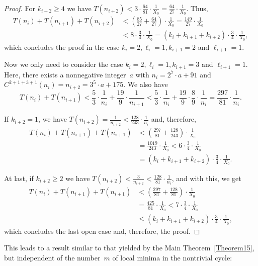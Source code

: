 \documentclass[12pt,reqno]{article}
\begin{document}
\begin{proof}
For $k_{i+2}\geq 4$ we have $T(n_{i+2})<3 \cdot \tfrac{64}{81} \cdot \tfrac{1}{X_0}=\tfrac{64}{27} \cdot \tfrac{1}{X_0}$. Thus, 
\begin{align*}
T(n_i)+T(n_{i+1})+T(n_{i+2})&<\left( \frac{85}{27} + \frac{64}{27}\right)\cdot \frac{1}{X_0} = \frac{149}{27} \cdot \frac{1}{X_0}\\
\quad &<8 \cdot \frac{3}{4}\cdot \frac{1}{X_0} = (k_i+k_{i+1}+k_{i+2}) \cdot \frac{3}{4}\cdot \frac{1}{X_0},
\end{align*}
which concludes the proof in the case $k_i=2, \ell_i=1, k_{i+1}=2$ and $\ell_{i+1}=1$. 
 
Now we only need to consider the case $k_i=2, \ell_i=1, k_{i+1}=3$ and $\ell_{i+1}=1$. Here, there exists a nonnegative integer~$a$ with $n_i=2^7 \cdot a + 91$ and $C^{2+1+3+1}(n_i)=n_{i+2}=3^5 \cdot a + 175$. We also have
\[T(n_i)+T(n_{i+1})< \frac{5}{3} \cdot \frac{1}{n_i}+ \frac{19}{9} \cdot \frac{1}{n_{i+1}}<\frac{5}{3} \cdot \frac{1}{n_i}+ \frac{19}{9} \cdot \frac{8}{9} \cdot \frac{1}{n_{i}}=\frac{297}{81} \cdot \frac{1}{n_i}.\]
 
If $k_{i+2}=1$, we have $T(n_{i+2})=\tfrac{1}{n_{i+2}}<\tfrac{128}{243} \cdot \tfrac{1}{n_i}$ and, therefore,
\begin{align*}
T(n_i)+T(n_{i+1})+T(n_{i+1})&< \left(\frac{297}{81}+\frac{128}{243}\right) \cdot \frac{1}{X_0}\\
\quad &= \frac{1019}{243}\cdot \frac{1}{X_0} < 6 \cdot \frac{3}{4}\cdot \frac{1}{X_0}\\
\quad &=  (k_i+k_{i+1}+k_{i+2}) \cdot \frac{3}{4}\cdot \frac{1}{X_0}.
\end{align*}

At last, if $k_{i+2}\geq 2$ we have $T(n_{i+2})<\tfrac{3}{n_{i+2}}<\tfrac{128}{81} \cdot \tfrac{1}{n_i}$, and with this, we get
\begin{align*}
T(n_i)+T(n_{i+1})+T(n_{i+1})&< \left(\frac{297}{81}+\frac{128}{81}\right) \cdot \frac{1}{X_0}\\
\quad &= \frac{425}{81}\cdot \frac{1}{X_0} < 7 \cdot \frac{3}{4}\cdot \frac{1}{X_0}\\
\quad &\leq  (k_i+k_{i+1}+k_{i+2}) \cdot \frac{3}{4}\cdot \frac{1}{X_0},
\end{align*}
which concludes the last open case and, therefore, the proof.
\end{proof}

This leads to a result similar to that yielded by the Main Theorem~\ref{Theorem15}, but independent of the number~$m$ of local minima in the nontrivial cycle:
\end{document}
